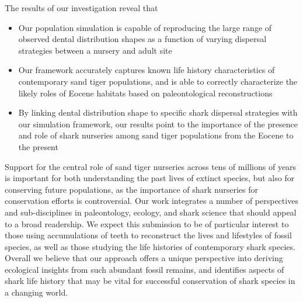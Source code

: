 \documentclass[ucm,12pt]{ucletter}
\begin{document}
\begin{letter}
The results of our investigation reveal that 
\begin{itemize}
    \item Our population simulation is capable of reproducing the large range of observed dental distribution shapes as a function of varying dispersal strategies between a nursery and adult site
    \item Our framework accurately captures known life history characteristics of contemporary sand tiger populations, and is able to correctly characterize the likely roles of Eocene habitats based on paleontological reconstructions
    \item By linking dental distribution shape to specific shark dispersal strategies with our simulation framework, our results point to the importance of the presence and role of shark nurseries among sand tiger populations from the Eocene to the present
\end{itemize}

Support for the central role of sand tiger nurseries across tens of millions of years is important for both understanding the past lives of extinct species, but also for conserving future populations, as the importance of shark nurseries for conservation efforts is controversial.
Our work integrates a number of perspectives and sub-disciplines in paleontology, ecology, and shark science that should appeal to a broad readership. We expect this submission to be of particular interest to those using accumulations of teeth to reconstruct the lives and lifestyles of fossil species, as well as those studying the life histories of contemporary shark species.
Overall we believe that our approach offers a unique perspective into deriving ecological insights from such abundant fossil remains, and identifies aspects of shark life history that may be vital for successful conservation of shark species in a changing world.


\vspace{0mm}


\end{letter}
\end{document}
